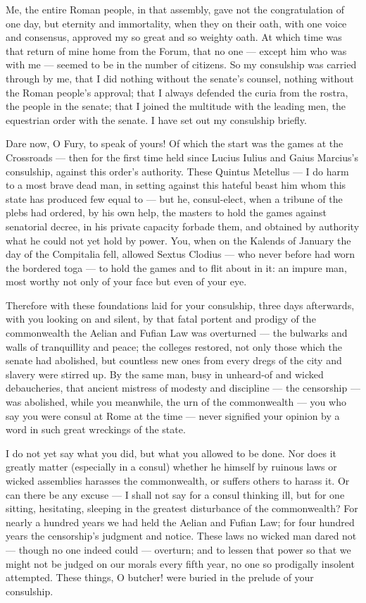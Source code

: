  Me, the entire Roman people, in that assembly, gave not the congratulation of one day, but eternity and immortality, when they on their oath, with one voice and consensus, approved my so great and so weighty oath. At which time was that return of mine home from the Forum, that no one — except him who was with me — seemed to be in the number of citizens. So my consulship was carried through by me, that I did nothing without the senate's counsel, nothing without the Roman people's approval; that I always defended the curia from the rostra, the people in the senate; that I joined the multitude with the leading men, the equestrian order with the senate. I have set out my consulship briefly.

 Dare now, O Fury, to speak of yours! Of which the start was the games at the Crossroads — then for the first time held since Lucius Iulius and Gaius Marcius's consulship, against this order's authority. These Quintus Metellus — I do harm to a most brave dead man, in setting against this hateful beast him whom this state has produced few equal to — but he, consul-elect, when a tribune of the plebs had ordered, by his own help, the masters to hold the games against senatorial decree, in his private capacity forbade them, and obtained by authority what he could not yet hold by power. You, when on the Kalends of January the day of the Compitalia fell, allowed Sextus Clodius — who never before had worn the bordered toga — to hold the games and to flit about in it: an impure man, most worthy not only of your face but even of your eye.

 Therefore with these foundations laid for your consulship, three days afterwards, with you looking on and silent, by that fatal portent and prodigy of the commonwealth the Aelian and Fufian Law was overturned — the bulwarks and walls of tranquillity and peace; the colleges restored, not only those which the senate had abolished, but countless new ones from every dregs of the city and slavery were stirred up. By the same man, busy in unheard-of and wicked debaucheries, that ancient mistress of modesty and discipline — the censorship — was abolished, while you meanwhile, the urn of the commonwealth — you who say you were consul at Rome at the time — never signified your opinion by a word in such great wreckings of the state.

 I do not yet say what you did, but what you allowed to be done. Nor does it greatly matter (especially in a consul) whether he himself by ruinous laws or wicked assemblies harasses the commonwealth, or suffers others to harass it. Or can there be any excuse — I shall not say for a consul thinking ill, but for one sitting, hesitating, sleeping in the greatest disturbance of the commonwealth? For nearly a hundred years we had held the Aelian and Fufian Law; for four hundred years the censorship's judgment and notice. These laws no wicked man dared not — though no one indeed could — overturn; and to lessen that power so that we might not be judged on our morals every fifth year, no one so prodigally insolent attempted. These things, O butcher! were buried in the prelude of your consulship.

